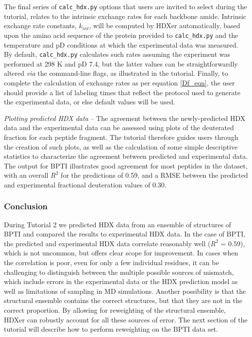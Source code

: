 \documentclass[9pt,tutorial]{livecoms}
\begin{document}
The final series of \texttt{calc\_hdx.py} options that users are invited to select during the tutorial, relates to the intrinsic exchange rates for each backbone amide.
Intrinsic exchange rate constants, $k_{int}$, will be computed by HDXer automatically, based upon the amino acid sequence of the protein provided to \texttt{calc\_hdx.py} and the temperature and pD conditions at which the experimental data was measured. 
By default, \texttt{calc\_hdx.py} calculates such rates assuming the experiment was performed at 298 K and pD 7.4, but the latter values can be straightforwardly altered \textit{via} the command-line flags, as illustrated in the tutorial.
Finally, to complete the calculation of exchange rates as per equation \ref{Df_eqn}, the user should provide a list of labeling times that reflect the protocol used to generate the experimental data, or else default values will be used.

\noindent
\textit{Plotting predicted HDX data} -- The agreement between the newly-predicted HDX data and the experimental data can be assessed using plots of the deuterated fraction for each peptide fragment.
The tutorial therefore guides users through the creation of such plots, as well as the calculation of some simple descriptive statistics to characterize the agreement between predicted and experimental data. 
The output for BPTI illustrates good agreement for most peptides in the dataset, with an overall $R^2$ for the predictions of 0.59, and a RMSE between the predicted and experimental fractional deuteration values of 0.30. 

\subsubsection{Conclusion}

During Tutorial 2 we predicted HDX data from an ensemble of structures of BPTI and compared the results to experimental HDX data. 
In the case of BPTI, the predicted and experimental HDX data correlate reasonably well ($R^2$ = 0.59), which is not uncommon, but offers clear scope for improvement.
In cases when the correlation is poor, even for only a few individual residues, it can be challenging to distinguish between the multiple possible sources of mismatch, which include errors in the experimental data or the HDX prediction model as well as limitations of sampling in MD simulations. 
Another possibility is that the structural ensemble contains the correct structures, but that they are not in the correct proportion. 
By allowing for reweighting of the structural ensemble, HDXer can robustly account for all these sources of error. 
The next section of the tutorial will describe how to perform reweighting on the BPTI data set. 
\end{document}
